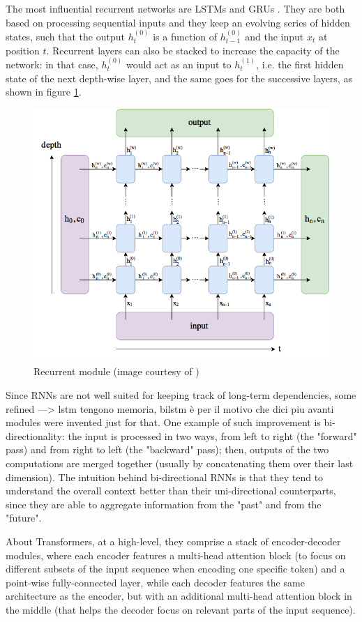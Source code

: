 \documentclass[a4paper,10pt]{report}
\begin{document}
The most influential recurrent networks are LSTMs \cite{lstm} and GRUs \cite{gru}. They are both based on processing sequential inputs and they keep an evolving series of hidden states, such that the output $h_t^{(0)}$ is a function of $h_{t-1}^{(0)}$ and the input $x_t$ at position $t$. Recurrent layers can also be stacked to increase the capacity of the network: in that case, $h_t^{(0)}$ would act as an input to $h_t^{(1)}$, i.e. the first hidden state of the next depth-wise layer, and the same goes for the successive layers, as shown in figure \ref{fig:recurrent}.

\begin{figure}[h]
    \center
    \includegraphics[width=0.65\linewidth]{recurrent}
    \caption{Recurrent module (image courtesy of \cite{recurrent-img})}
    \label{fig:recurrent}
\end{figure}

Since RNNs are not well suited for keeping track of long-term dependencies, some refined ---> lstm tengono memoria, bilstm è per il motivo che dici piu avanti
modules were invented just for that. One example of such improvement is bi-directionality: the input is processed in two ways, from left to right (the "forward" pass) and from right to left (the "backward" pass); then, outputs of the two computations are merged together (usually by concatenating them over their last dimension). The intuition behind bi-directional RNNs is that they tend to understand the overall context better than their uni-directional counterparts, since they are able to aggregate information from the "past" and from the "future".

About Transformers, at a high-level, they comprise a stack of encoder-decoder modules, where each encoder features a multi-head attention block (to focus on different subsets of the input sequence when encoding one specific token) and a point-wise fully-connected layer, while each decoder features the same architecture as the encoder, but with an additional multi-head attention block in the middle (that helps the decoder focus on relevant parts of the input sequence).
\end{document}
